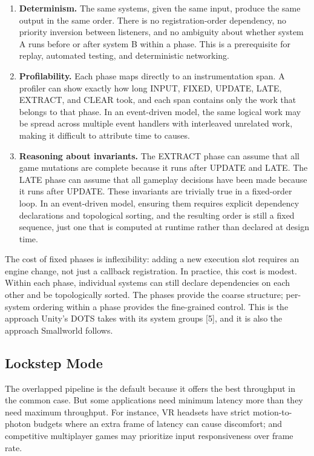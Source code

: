 \documentclass[
  11pt,
  letterpaper,
  DIV=11,
  numbers=noendperiod,
  twoside,
  open=right]{scrreprt}
\begin{document}
\begin{enumerate}
\def\labelenumi{\arabic{enumi}.}
\item
  \textbf{Determinism.} The same systems, given the same input, produce
  the same output in the same order. There is no registration-order
  dependency, no priority inversion between listeners, and no ambiguity
  about whether system A runs before or after system B within a phase.
  This is a prerequisite for replay, automated testing, and
  deterministic networking.
\item
  \textbf{Profilability.} Each phase maps directly to an instrumentation
  span. A profiler can show exactly how long INPUT, FIXED, UPDATE, LATE,
  EXTRACT, and CLEAR took, and each span contains only the work that
  belongs to that phase. In an event-driven model, the same logical work
  may be spread across multiple event handlers with interleaved
  unrelated work, making it difficult to attribute time to causes.
\item
  \textbf{Reasoning about invariants.} The EXTRACT phase can assume that
  all game mutations are complete because it runs after UPDATE and LATE.
  The LATE phase can assume that all gameplay decisions have been made
  because it runs after UPDATE. These invariants are trivially true in a
  fixed-order loop. In an event-driven model, ensuring them requires
  explicit dependency declarations and topological sorting, and the
  resulting order is still a fixed sequence, just one that is computed
  at runtime rather than declared at design time.
\end{enumerate}

The cost of fixed phases is inflexibility: adding a new execution slot
requires an engine change, not just a callback registration. In
practice, this cost is modest. Within each phase, individual systems can
still declare dependencies on each other and be topologically sorted.
The phases provide the coarse structure; per-system ordering within a
phase provides the fine-grained control. This is the approach Unity's
DOTS takes with its system groups {[}5{]}, and it is also the approach
Smallworld follows.

\subsection{Lockstep Mode}\label{lockstep-mode}

The overlapped pipeline is the default because it offers the best
throughput in the common case. But some applications need minimum
latency more than they need maximum throughput. For instance, VR
headsets have strict motion-to-photon budgets where an extra frame of
latency can cause discomfort; and competitive multiplayer games may
prioritize input responsiveness over frame rate.
\end{document}

